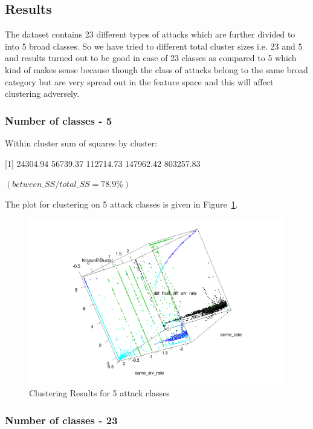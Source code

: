 \documentclass[11pt]{article}
\begin{document}
\subsection{Results}

The dataset contains 23 different types of attacks which are further divided to into 5 broad classes. So we have tried to different total cluster sizes i.e. 23 and 5 and results turned out to be good in case of 23 classes as compared to 5 which kind of makes sense because though the class of attacks belong to the same broad category but are very spread out in the feature space and this will affect clustering adversely.

\subsubsection{Number of classes - 5}

Within cluster sum of squares by cluster:

[1]  24304.94  56739.37 112714.73 147962.42 803257.83

$ (between\_SS / total\_SS =  78.9 \%)$

The plot for clustering on 5 attack classes is given in Figure~\ref{clust5}.

\begin{figure}[htp]
\centering
\includegraphics[scale=0.40]{images/clust-5.png}
\caption{Clustering Results for 5 attack classes}
\label{clust5}
\end{figure}

\subsubsection{Number of classes - 23}
\end{document}
